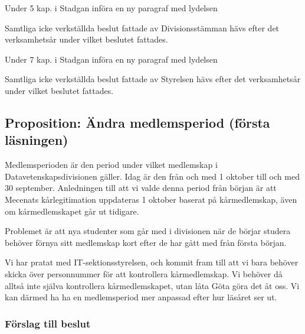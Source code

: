 \documentclass[protokoll]{dvd}
\begin{document}
\begin{attsatser}
	\item Under 5 kap. i Stadgan införa en ny paragraf med lydelsen

	\begin{displayquote}
		Samtliga icke verkställda beslut fattade av Divisionsstämman hävs efter det verksamhetsår under vilket beslutet fattades.
	\end{displayquote}

	\item Under 7 kap. i Stadgan införa en ny paragraf med lydelsen

	\begin{displayquote}
		Samtliga icke verkställda beslut fattade av Styrelsen hävs efter det verksamhetsår under vilket beslutet fattades.
	\end{displayquote}
\end{attsatser}

\newpage
\subsection{Proposition: Ändra medlemsperiod (första läsningen)}

Medlemsperioden är den period under vilket medlemskap i Datavetenskapsdivisionen gäller.
Idag är den från och med 1 oktober till och med 30 september.
Anledningen till att vi valde denna period från början är att Mecenats kårlegitimation uppdateras 1 oktober baserat på kårmedlemskap, även om kårmedlemskapet går ut tidigare.

Problemet är att nya studenter som går med i divisionen när de börjar studera behöver förnya sitt medlemskap kort efter de har gått med från första början.

Vi har pratat med IT-sektionsstyrelsen, och kommit fram till att vi bara behöver skicka över personnummer för att kontrollera kårmedlemskap.
Vi behöver då alltså inte själva kontrollera kårmedlemskapet, utan låta Göta göra det åt oss.
Vi kan därmed ha ha en medlemsperiod mer anpassad efter hur läsåret ser ut.

\subsubsection*{Förslag till beslut}
\end{document}
